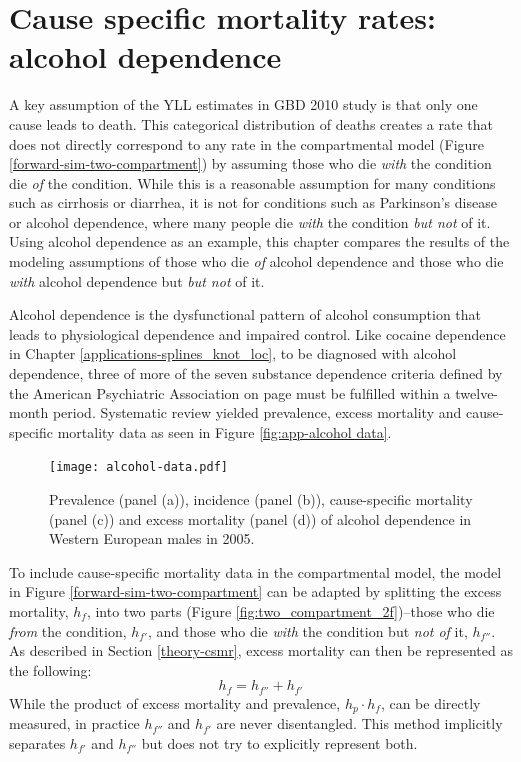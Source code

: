 \chapter{Cause specific mortality rates: alcohol dependence}
\label{applications-csmr}

A key assumption of the YLL estimates in GBD 2010 study is that only
one cause leads to death.  This categorical distribution of deaths
creates a rate that does not directly correspond to any rate in the
compartmental model (Figure \ref{forward-sim-two-compartment}) by
assuming those who die \emph{with} the condition die \emph{of} the
condition.  While this is a reasonable assumption for many conditions
such as cirrhosis or diarrhea, it is not for conditions such as
Parkinson's disease or alcohol dependence, where many people die \emph{with}
the condition \emph{but not} of it.  Using alcohol dependence as an 
example, this chapter compares the results of
the modeling assumptions of those who die \emph{of} alcohol dependence
and those who die \emph{with} alcohol dependence but \emph{but not} of it.

Alcohol dependence is the dysfunctional pattern of alcohol consumption
that leads to physiological dependence and impaired control.  Like
cocaine dependence in Chapter \ref{applications-splines_knot_loc}, to
be diagnosed with alcohol dependence, three of more of the seven
substance dependence criteria defined by the American Psychiatric
Association on page \pageref{page:app-substance_dependence} must be
fulfilled within a twelve-month period. \cite{american_psychiatric_association_diagnostic_2000, hasin_prevalence_2007}
Systematic review yielded prevalence, excess mortality and
cause-specific mortality data as seen in Figure \ref{fig:app-alcohol
  data}.

    \begin{figure}[h]
        \begin{center}
            \texttt{[image: alcohol-data.pdf]}
            \caption{Prevalence (panel (a)), incidence (panel (b)),
              cause-specific mortality (panel (c)) and excess
              mortality (panel (d)) of alcohol dependence in Western
              European males in 2005.}
            \label{fig:app-alcohol data}
        \end{center}
    \end{figure}

To include cause-specific mortality data in the compartmental model,
the model in Figure \ref{forward-sim-two-compartment} can be adapted
by splitting the excess mortality, $h_{f}$, into two parts (Figure
\ref{fig:two_compartment_2f})--those who die \emph{from} the
condition, $h_{f'}$, and those who die \emph{with} the condition but
\emph{not of} it, $h_{f''}$.  As described in Section
\ref{theory-csmr}, excess mortality can then be represented as the
following:
    \begin{equation}
        h_{f} = h_{f''} + h_{f'}
    \end{equation}
While the product of excess mortality and prevalence, $h_{p} \cdot h_{f}$,
can be directly measured, in practice $h_{f''}$ and $h_{f'}$ are never
disentangled.  This method implicitly separates $h_{f'}$ and $h_{f''}$
but does not try to explicitly represent both.

